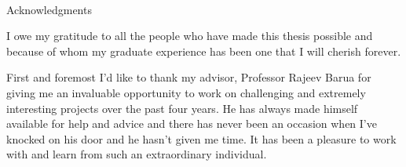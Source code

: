 
\renewcommand{\baselinestretch}{2}
\small\normalsize
\hbox{\ }
 
\vspace{-.65in}

\begin{center}
\large{Acknowledgments} 
\end{center} 

\vspace{1ex}

I owe my gratitude to all the people who have made this thesis possible and because of whom my graduate experience has been one that I will cherish forever.

First and foremost I'd like to thank my advisor, Professor Rajeev Barua for giving me an invaluable opportunity to work on challenging and extremely interesting projects over the past four years. He has always made himself available for help and advice and there has never been an occasion when I've knocked on his door and he hasn't given me time. It has been a pleasure to work with and learn from such an extraordinary individual.


